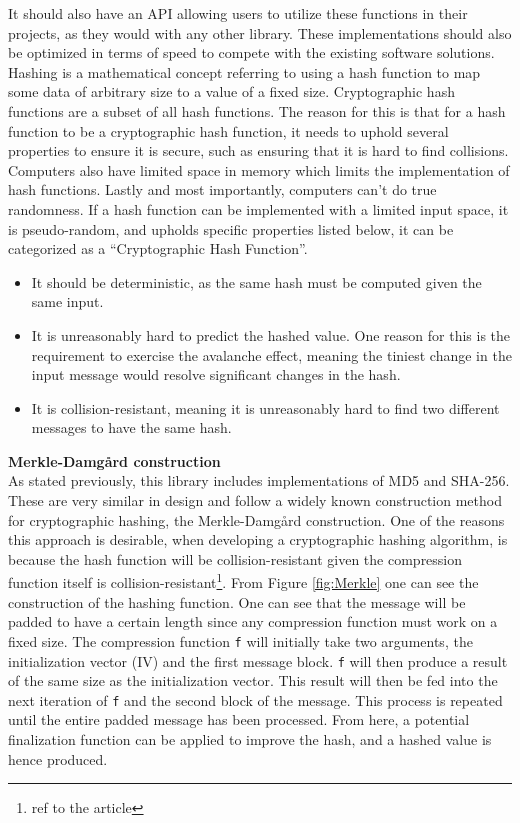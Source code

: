 \documentclass[a4paper]{article}
\begin{document}
It should also have an API allowing users to utilize these functions in their projects, as they would with any other library.
These implementations should also be optimized in terms of speed to compete with the existing software solutions.
Hashing is a mathematical concept referring to using a hash function to map some data of arbitrary size to a value of a fixed size. Cryptographic hash functions are a subset of all hash functions.
The reason for this is that for a hash function to be a cryptographic hash function, it needs to uphold several properties to ensure it is secure, such as ensuring that it is hard to find collisions. Computers also have limited space in memory which limits the implementation of hash functions. Lastly and most importantly, computers can't do true randomness.
If a hash function can be implemented with a limited input space, it is pseudo-random, and upholds specific properties listed below, it can be categorized as a ``Cryptographic Hash Function''.
\begin{itemize}
\item It should be deterministic, as the same hash must be computed given the same input.
\item It is unreasonably hard to predict the hashed value. One reason for this is the requirement to exercise the avalanche effect, meaning the tiniest change in the input message would resolve significant changes in the hash.
\item It is collision-resistant, meaning it is unreasonably hard to find two different messages to have the same hash.
\end{itemize}

\textbf{Merkle-Damgård construction}\\
As stated previously, this library includes implementations of MD5 and SHA-256. These are very similar in design and follow a widely known construction method for cryptographic hashing, the Merkle-Damgård construction. One of the reasons this approach is desirable, when developing a cryptographic hashing algorithm, is because the hash function will be collision-resistant given the compression function itself is collision-resistant\footnote{ref to the article}.
From Figure \ref{fig:Merkle} one can see the construction of the hashing function. One can see that the message will be padded to have a certain length since any compression function must work on a fixed size. The compression function \texttt{f} will initially take two arguments, the initialization vector (IV) and the first message block. \texttt{f} will then produce a result of the same size as the initialization vector. This result will then be fed into the next iteration of \texttt{f} and the second block of the message. This process is repeated until the entire padded message has been processed. From here, a potential finalization function can be applied to improve the hash, and a hashed value is hence produced.
\end{document}
